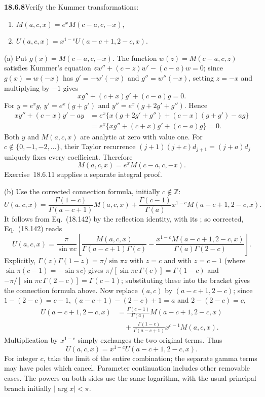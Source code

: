 \par\bigskip
\noindent\textbf{18.6.8}\quad Verify the Kummer transformations:
\begin{enumerate}
\item[(a)] $M(a,c,x)=e^{x}M(c-a,c,-x)$,
\item[(b)] $U(a,c,x)=x^{1-c}U(a-c+1,2-c,x)$.
\end{enumerate}
\par\nobreak
\solution
(a) Put $g(x)=M(c-a,c,-x)$.  The function $w(z)=M(c-a,c,z)$
satisfies Kummer's equation $zw''+(c-z)w'-(c-a)w=0$; since
$g(x)=w(-x)$ has $g'=-w'(-x)$ and $g''=w''(-x)$, setting $z=-x$
and multiplying by $-1$ gives
\[
xg''+(c+x)g'+(c-a)g=0.
\]
For $y=e^xg$, $y'=e^x(g+g')$ and $y''=e^x(g+2g'+g'')$.
Hence
\begin{align*}
xy''+(c-x)y'-ay
 &=e^x\{x(g+2g'+g'')+(c-x)(g+g')-ag\}\\
 &=e^x\{xg''+(c+x)g'+(c-a)g\}=0.
\end{align*}
Both $y$ and $M(a,c,x)$ are analytic at zero with value one.
For $c\notin\{0,-1,-2,\ldots\}$, their Taylor recurrence
$(j+1)(j+c)d_{j+1}=(j+a)d_j$ uniquely fixes every coefficient.
Therefore
\[
\boxed{M(a,c,x)=e^xM(c-a,c,-x)}.
\]
Exercise~18.6.11 supplies a separate integral proof.

(b) Use the corrected connection formula, initially $c\notin\mathbb Z$:
\[
U(a,c,x)=\frac{\Gamma(1-c)}{\Gamma(a-c+1)}M(a,c,x)
 +\frac{\Gamma(c-1)}{\Gamma(a)}x^{1-c}M(a-c+1,2-c,x).
\]
It follows from Eq.~(18.142) by the reflection identity, with its
; so
corrected, Eq.~(18.142) reads
\[
U(a,c,x)=\frac{\pi}{\sin\pi c}\left[
 \frac{M(a,c,x)}{\Gamma(a-c+1)\Gamma(c)}
 -\frac{x^{1-c}M(a-c+1,2-c,x)}{\Gamma(a)\Gamma(2-c)}\right].
\]
Explicitly, $\Gamma(z)\Gamma(1-z)=\pi/\sin\pi z$ with $z=c$ and
with $z=c-1$ (where $\sin\pi(c-1)=-\sin\pi c$) gives
$\pi/[\sin\pi c\,\Gamma(c)]=\Gamma(1-c)$ and
$-\pi/[\sin\pi c\,\Gamma(2-c)]=\Gamma(c-1)$; substituting these
into the bracket gives the connection formula above.
Now replace $(a,c)$ by $(a-c+1,2-c)$; since $1-(2-c)=c-1$,
$(a-c+1)-(2-c)+1=a$ and $2-(2-c)=c$,
\begin{align*}
U(a-c+1,2-c,x)
 &=\frac{\Gamma(c-1)}{\Gamma(a)}M(a-c+1,2-c,x)\\
 &\quad+\frac{\Gamma(1-c)}{\Gamma(a-c+1)}x^{c-1}M(a,c,x).
\end{align*}
Multiplication by $x^{1-c}$ simply exchanges the two original
terms.  Thus
\[
\boxed{U(a,c,x)=x^{1-c}U(a-c+1,2-c,x)}.
\]
For integer $c$, take the limit of the entire combination; the
separate gamma terms may have poles which cancel.  Parameter
continuation includes other removable cases.  The powers on both
sides use the same logarithm, with the usual principal branch
initially $|\arg x|<\pi$.

